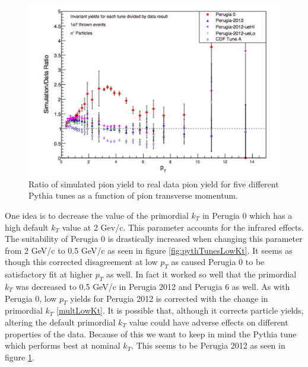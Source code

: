 \documentclass[abstract = on,listof=totoc, bibliography=totoc]{scrreprt}
\begin{document}
\begin{figure}
\begin{center}
\includegraphics[width = .77\textwidth]{piPlusPythTunes}
\caption[]{Ratio of simulated pion yield to real data pion yield for five different Pythia tunes as a function of pion transverse momentum.}
\label{fig:piPlusPythTunes}
\end{center}
\end{figure}

One idea is to decrease the value of the primordial $k_T$ in Perugia 0 which has a high default $k_T$ value at 2 Gev/c. This parameter accounts for the infrared effects.\cite{pythTunes} The suitability of Perugia 0 is drastically increased when changing this parameter from 2 GeV/c to 0.5 GeV/c as seen in figure \ref{fig:pythTunesLowKt}. It seems as though this corrected disagreement at low $p_T$ as caused Perugia 0 to be satisfactory fit at higher $p_T$ as well. In fact it worked so well that the primordial $k_T$ was decreased to 0.5 GeV/c in Perugia 2012 and Perugia 6 as well. As with Perugia 0, low $p_T$ yields for Perugia 2012 is corrected with the change in primordial $k_T$ \ref{multLowKt}. It is possible that, although it corrects particle yields, altering the default primordial $k_T$ value could have adverse effects on different properties of the data. Because of this we want to keep in mind the Pythia tune which performs best at nominal $k_T$. This seems to be Perugia 2012 as seen in figure \ref{fig:piPlusPythTunes}.
\end{document}
